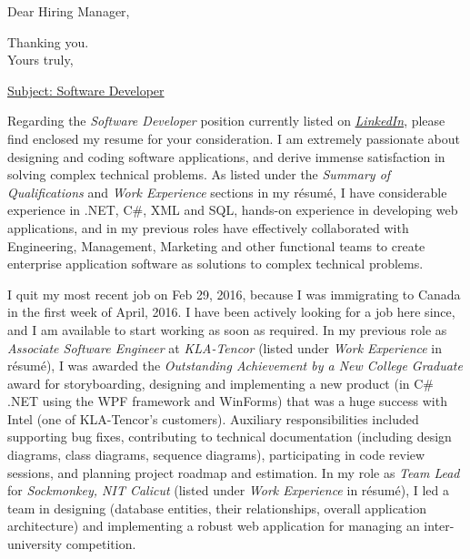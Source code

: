 \date{September 23, 2016}
\opening{Dear Hiring Manager,}
\closing{Thanking you.\\Yours truly,}
\makelettertitle

\underline{Subject: Software Developer}
\newline 

Regarding the \emph{Software Developer} position currently listed on \href{https://www.linkedin.com/jobs/view/205365298?refId=6f630c4d-b372-4e20-bc6a-87deafcbac25}{\emph{LinkedIn}}, please find enclosed my resume for your consideration. I am extremely passionate about designing and coding software applications, and derive immense satisfaction in solving complex technical problems. As listed under the \emph{Summary of Qualifications} and \emph{Work Experience} sections in my résumé, I have considerable experience in .NET, C\#, XML and  SQL, hands-on experience in developing web applications, and in my previous roles have effectively collaborated with Engineering, Management, Marketing and other functional teams to create enterprise application software as solutions to complex technical problems.

I quit my most recent job on Feb 29, 2016, because I was immigrating to Canada in the first week of April, 2016. I have been actively looking for a job here since, and I am available to start working as soon as required. In my previous role as \emph{Associate Software Engineer} at \emph{KLA-Tencor} (listed under \emph{Work Experience} in résumé), I was awarded the \emph{Outstanding Achievement by a New College Graduate} award for storyboarding, designing and implementing a new product (in C\# .NET using the WPF framework and WinForms) that was a huge success with Intel (one of KLA-Tencor's customers). Auxiliary responsibilities included supporting bug fixes, contributing to technical documentation (including design diagrams, class diagrams, sequence diagrams), participating in code review sessions, and planning project roadmap and estimation. In my role as \emph{Team Lead} for \emph{Sockmonkey, NIT Calicut} (listed under \emph{Work Experience} in résumé), I led a team in designing (database entities, their relationships, overall application architecture) and implementing a robust web application for managing an inter-university competition.


